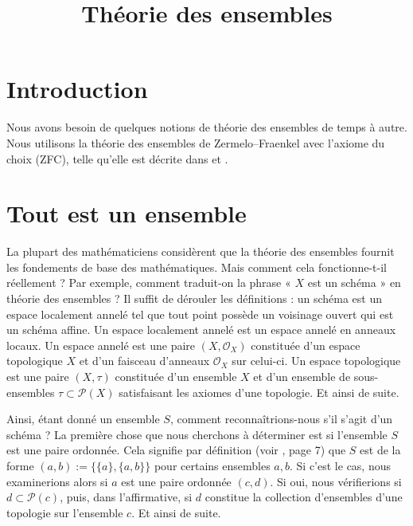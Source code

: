 

%


\title{Théorie des ensembles}


\maketitle

\label{section-phantom}

\tableofcontents

\section{Introduction}
\label{section-introduction}

\noindent
Nous avons besoin de quelques notions de théorie des ensembles de temps à autre.
Nous utilisons la théorie des ensembles de Zermelo--Fraenkel avec l'axiome du
choix (ZFC), telle qu'elle est décrite dans \cite{Kunen} et \cite{Jech}.

\section{Tout est un ensemble}
\label{section-sets-everything}

\noindent
La plupart des mathématiciens considèrent que la théorie des ensembles fournit
les fondements de base des mathématiques. Mais comment cela fonctionne-t-il
réellement ? Par exemple, comment traduit-on la phrase
« $X$ est un schéma » en théorie des ensembles ? Il suffit de dérouler les
définitions : un schéma est un espace localement annelé tel que tout point
possède un voisinage ouvert qui est un schéma affine. Un espace localement
annelé est un espace annelé en anneaux locaux. Un espace annelé est une paire
$(X, \mathcal{O}_X)$ constituée
d'un espace topologique $X$ et d'un faisceau d'anneaux $\mathcal{O}_X$ sur
celui-ci. Un espace topologique est une paire $(X, \tau)$ constituée d'un
ensemble $X$ et d'un ensemble de sous-ensembles
$\tau \subset \mathcal{P}(X)$ satisfaisant les axiomes d'une topologie. Et
ainsi de suite.

\medskip\noindent
Ainsi, étant donné un ensemble $S$, comment reconnaîtrions-nous s'il s'agit
d'un schéma ? La première chose que nous cherchons à déterminer est si
l'ensemble $S$ est une paire ordonnée. Cela signifie par définition (voir
\cite{Jech}, page 7) que $S$ est de la forme
$(a, b) := \{\{a\}, \{a, b\}\}$ pour certains ensembles $a, b$. Si c'est le
cas, nous examinerions alors si $a$ est une paire ordonnée $(c, d)$. Si oui,
nous vérifierions si $d \subset \mathcal{P}(c)$, puis, dans l'affirmative, si
$d$ constitue la collection d'ensembles d'une topologie sur l'ensemble $c$.
Et ainsi de suite.

